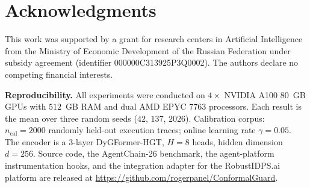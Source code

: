 \documentclass[12pt,a4paper]{article}
\theoremstyle{definition}
\theoremstyle{remark}
\newcommand{\benchname}{AgentChain-26}
\begin{document}
\section*{Acknowledgments}

This work was supported by a grant for research centers in Artificial Intelligence from the Ministry of Economic Development of the Russian Federation under subsidy agreement (identifier 000000C313925P3Q0002). The authors declare no competing financial interests.

\noindent\textbf{Reproducibility.} All experiments were conducted on $4 \times $ NVIDIA A100 80~GB GPUs with $512$~GB RAM and dual AMD EPYC 7763 processors. Each result is the mean over three random seeds ($42$, $137$, $2026$). Calibration corpus: $n_{\mathrm{cal}} = 2000$ randomly held-out execution traces; online learning rate $\gamma = 0.05$. The encoder is a 3-layer DyGFormer-HGT, $H = 8$ heads, hidden dimension $d = 256$. Source code, the \benchname{} benchmark, the agent-platform instrumentation hooks, and the integration adapter for the RobustIDPS.ai platform are released at \url{https://github.com/rogerpanel/ConformalGuard}.


\end{document}

